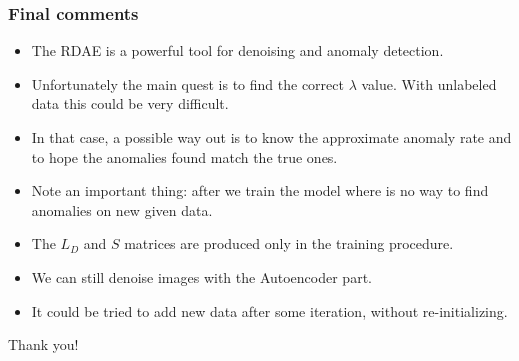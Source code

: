 \documentclass{beamer}
\theoremstyle{plain}
\theoremstyle{definition}
\theoremstyle{remark}
\begin{document}
\begin{frame}
	\frametitle{Final comments}
	\begin{itemize}
		\item The RDAE is a powerful tool for denoising and anomaly detection.
		\item Unfortunately the main quest is to find the correct $\lambda$ value. With unlabeled data this could be very difficult.
		\item In that case, a possible way out is to know the approximate anomaly rate and to hope the anomalies found match the true ones.
	\end{itemize}
\end{frame}

\begin{frame}
	\begin{itemize}
		\item Note an important thing: after we train the model where is no way to find anomalies on new given data.
		\item The $L_D$ and $S$ matrices are produced only in the training procedure.
		\item We can still denoise images with the Autoencoder part.
		\item It could be tried to add new data after some iteration, without re-initializing.
	\end{itemize}
\end{frame}

\begin{frame}
	\Huge{\centerline{Thank you!}} 
\end{frame}

\nocite{RAE}
\nocite{DATA}
\nocite{RPCA}
\nocite{PROX}






\end{document}
